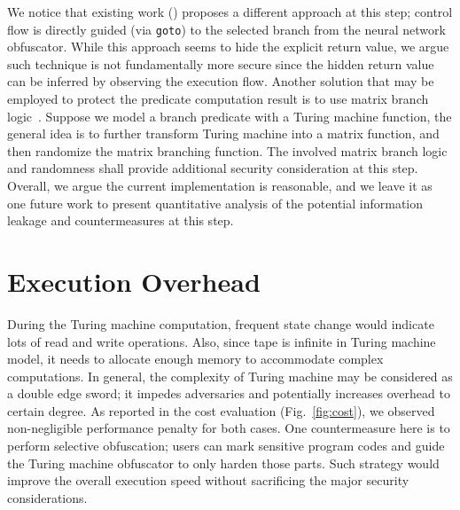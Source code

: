 We notice that existing work (\cite{Ma, Maieee}) proposes a different approach
at this step; control flow is directly guided (via \texttt{goto}) to the
selected branch from the neural network obfuscator. While this approach seems to
hide the explicit return value, we argue such technique is not fundamentally
more secure since the hidden return value can be inferred by observing the
execution flow. Another solution that may be employed to protect the predicate
computation result is to use matrix branch logic~\cite{Samjam}. Suppose we model
a branch predicate with a Turing machine function, the general idea is to
further transform Turing machine into a matrix function, and then randomize the
matrix branching function. The involved matrix branch logic and randomness shall
provide additional security consideration at this step. Overall, we argue the
current implementation is reasonable, and we leave it as one future work to
present quantitative analysis of the potential information leakage and
countermeasures at this step.

\section{Execution Overhead}
During the Turing machine computation, frequent state change would indicate lots
of read and write operations. Also, since tape is infinite in Turing machine
model, it needs to allocate enough memory to accommodate complex computations.
In general, the complexity of Turing machine may be considered as a double edge
sword; it impedes adversaries and potentially increases overhead to certain
degree. As reported in the cost evaluation (Fig.~\ref{fig:cost}), we observed
non-negligible performance penalty for both cases. One countermeasure here is to
perform selective obfuscation; users can mark sensitive program codes and guide
the Turing machine obfuscator to only harden those parts. Such strategy would
improve the overall execution speed without sacrificing the major security
considerations.
